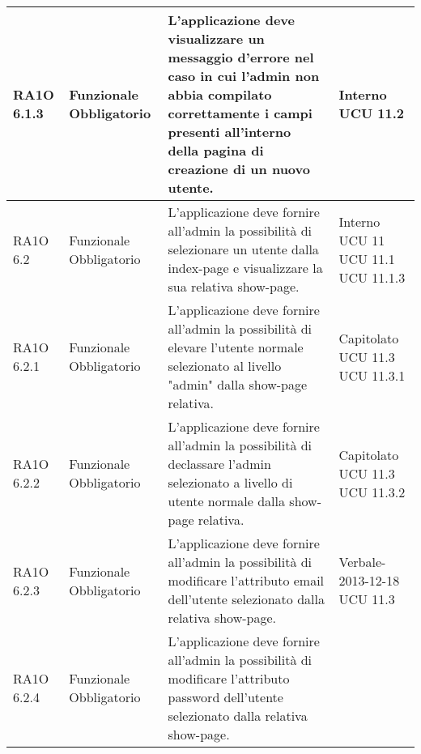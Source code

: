 \begin{center}
\begin{longtable}{ | l | p{2cm} | p{5cm} | p{1.7cm} |}
        RA1O 6.1.3 & Funzionale \newline  Obbligatorio  & L'applicazione deve visualizzare un messaggio d'errore nel caso in cui l'admin non abbia compilato correttamente i campi presenti all'interno della pagina di creazione di un nuovo utente. &  Interno \newline  UCU 11.2 \newline  \\ \hline      
        RA1O 6.2 & Funzionale \newline  Obbligatorio  & L'applicazione deve fornire all'admin la possibilità di selezionare un utente dalla index-page e visualizzare la sua relativa show-page. &  Interno \newline  UCU 11 \newline  UCU 11.1 \newline  UCU 11.1.3 \newline  \\ \hline      
        RA1O 6.2.1 & Funzionale \newline  Obbligatorio  & L'applicazione deve fornire all'admin la possibilità di elevare l'utente normale selezionato al livello "admin" dalla show-page relativa. &  Capitolato \newline  UCU 11.3 \newline  UCU 11.3.1 \newline  \\ \hline      
        RA1O 6.2.2 & Funzionale \newline  Obbligatorio  & L'applicazione deve fornire all'admin la possibilità di declassare l'admin selezionato a livello di utente normale dalla show-page relativa. &  Capitolato \newline  UCU 11.3 \newline  UCU 11.3.2 \newline  \\ \hline      
        RA1O 6.2.3 & Funzionale \newline  Obbligatorio  & L'applicazione deve fornire all'admin la possibilità di modificare l'attributo email dell'utente selezionato dalla relativa show-page. &  Verbale-2013-12-18 \newline  UCU 11.3 \newline  \\ \hline      
        RA1O 6.2.4 & Funzionale \newline  Obbligatorio  & L'applicazione deve fornire all'admin la possibilità di modificare l'attributo password dell'utente selezionato dalla relativa show-page.

\end{longtable}
\end{center}
